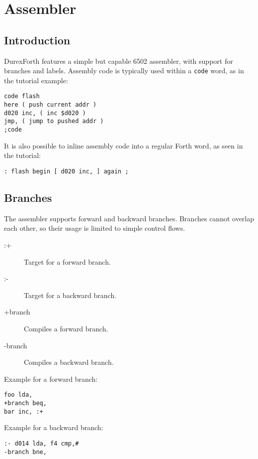 \chapter{Assembler}

\section{Introduction}

DurexForth features a simple but capable 6502 assembler, with support for branches and labels. Assembly code is typically used within a \texttt{code} word, as in the tutorial example:

\begin{verbatim}
code flash
here ( push current addr )
d020 inc, ( inc $d020 )
jmp, ( jump to pushed addr )
;code
\end{verbatim}

It is also possible to inline assembly code into a regular Forth word, as seen in the tutorial:

\begin{verbatim}
: flash begin [ d020 inc, ] again ;
\end{verbatim}

\section{Branches}

The assembler supports forward and backward branches. Branches cannot overlap each other, so their usage is limited to simple control flows.

\begin{description}
\item[:+] Target for a forward branch.
\item[:-] Target for a backward branch.
\item[+branch] Compiles a forward branch.
\item[-branch] Compiles a backward branch.
\end{description}

Example for a forward branch:

\begin{verbatim}
foo lda,
+branch beq,
bar inc, :+
\end{verbatim}

Example for a backward branch:

\begin{verbatim}
:- d014 lda, f4 cmp,#
-branch bne,
\end{verbatim}

